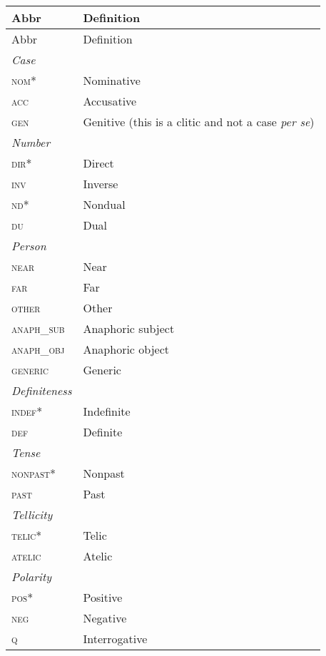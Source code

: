 \documentclass{book}
\begin{document}
\begin{longtabu} to \linewidth {lY}
    Abbr & Definition \\
    \hline
    \endfirsthead
    
    Abbr & Definition \\
    \hline
    \endhead
    
    \endfoot
    
    \endlastfoot
    
    \textit{Case} & \\
    \textsc{nom*} & Nominative \\
    \textsc{acc} & Accusative \\
    \textsc{gen} & Genitive (this is a clitic and not a case \emph{per se}) \\
    \hline
    \textit{Number} & \\
    \textsc{dir*} & Direct \\
    \textsc{inv} & Inverse \\
    \textsc{nd*} & Nondual \\
    \textsc{du} & Dual \\
    \hline
    \textit{Person} & \\
    \textsc{near} & Near \\
    \textsc{far} & Far \\
    \textsc{other} & Other \\
    \textsc{anaph\_sub} & Anaphoric subject \\
    \textsc{anaph\_obj} & Anaphoric object \\
    \textsc{generic} & Generic \\
    \hline
    \textit{Definiteness} & \\
    \textsc{indef*} & Indefinite \\
    \textsc{def} & Definite \\
    \hline
    \textit{Tense} & \\
    \textsc{nonpast*} & Nonpast \\
    \textsc{past} & Past \\
    \hline
    \textit{Tellicity} & \\
    \textsc{telic*} & Telic \\
    \textsc{atelic} & Atelic \\
    \hline
    \textit{Polarity} & \\
    \textsc{pos*} & Positive \\
    \textsc{neg} & Negative \\
    \textsc{q} & Interrogative \\

\end{longtabu}
\end{document}
